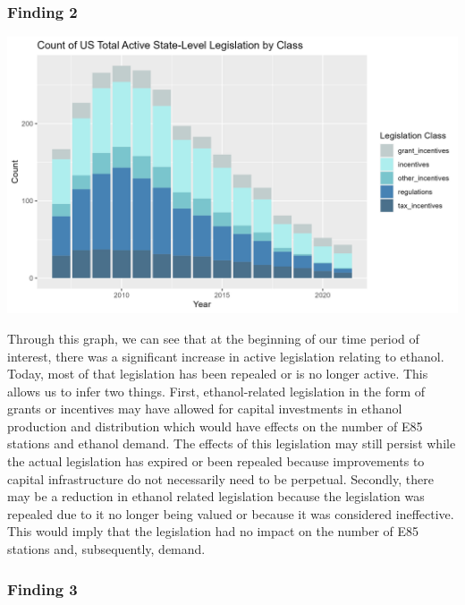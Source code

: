 \documentclass[
]{article}
\begin{document}
\hypertarget{finding-2}{%
\subsubsection{Finding 2}\label{finding-2}}

\includegraphics[width=6.25in,height=\textheight]{images/StackedTotalLeg.png}

Through this graph, we can see that at the beginning of our time period
of interest, there was a significant increase in active legislation
relating to ethanol. Today, most of that legislation has been repealed
or is no longer active. This allows us to infer two things. First,
ethanol-related legislation in the form of grants or incentives may have
allowed for capital investments in ethanol production and distribution
which would have effects on the number of E85 stations and ethanol
demand. The effects of this legislation may still persist while the
actual legislation has expired or been repealed because improvements to
capital infrastructure do not necessarily need to be perpetual.
Secondly, there may be a reduction in ethanol related legislation
because the legislation was repealed due to it no longer being valued or
because it was considered ineffective. This would imply that the
legislation had no impact on the number of E85 stations and,
subsequently, demand.

\hypertarget{finding-3}{%
\subsubsection{Finding 3}\label{finding-3}}
\end{document}
